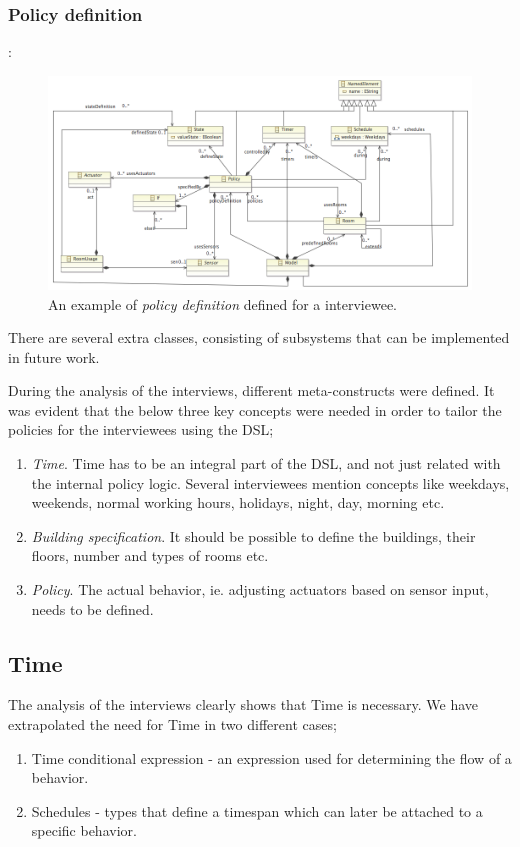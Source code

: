 \documentclass{llncs}
\begin{document}
\subsubsection{Policy definition}:
\begin{figure}
  \centering
    \includegraphics[scale=0.3]{ecore-policy-definition.png}	
	\caption{An example of \textit{policy definition} defined for a interviewee.}
	\label{fig:ecore-policy-definition}
\end{figure}

\pagebreak
There are several extra classes, consisting of subsystems that can be implemented in future work.

During the analysis of the interviews, different meta-constructs were defined. It was evident that the below three key concepts were needed in order to tailor the policies for the interviewees using the DSL;

\begin{enumerate}
	\item \textit{Time}. Time has to be an integral part of the DSL, and not just related with the internal policy logic. Several interviewees mention concepts like weekdays, weekends, normal working hours, holidays, night, day, morning etc.
	
	\item \textit{Building specification}. It should be possible to define the buildings, their floors, number and types of rooms etc.

	\item \textit{Policy}. The actual behavior, ie. adjusting actuators based on sensor input, needs to be defined. 
\end{enumerate}

\subsection{Time}\label{subsec:time}
The analysis of the interviews clearly shows that Time is necessary. We have extrapolated the need for Time in two different cases;
	\begin{enumerate}
		\item Time conditional expression - an expression used for determining the flow of a behavior.
		\item Schedules - types that define a timespan which can later be attached to a specific behavior.
	\end{enumerate}
\end{document}
